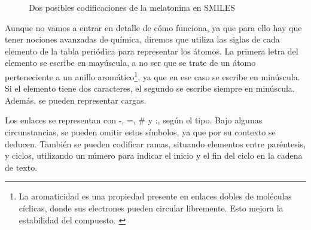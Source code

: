 \begin{figure}[H]
\centering
    \caption{Dos posibles codificaciones de la melatonina en SMILES \cite{smiles_wikipedia}} \label{fig:figura2}
\end{figure}

Aunque no vamos a entrar en detalle de cómo funciona, ya que para ello hay que tener nociones avanzadas de química, diremos que utiliza las siglas de cada elemento de la tabla periódica para representar los átomos. La primera letra del elemento se escribe en mayúscula, a no ser que se trate de un átomo perteneciente a un anillo aromático\footnote{La aromaticidad es una propiedad presente en enlaces dobles de moléculas cíclicas, donde sus electrones pueden circular libremente. Esto mejora la estabilidad del compuesto. \cite{aromaticidad, aromaticidad_wikipedia}}, ya que en ese caso se escribe en minúscula. Si el elemento tiene dos caracteres, el segundo se escribe siempre en minúscula. Además, se pueden representar cargas.

Los enlaces se representan con -, =, \# y :, según el tipo. Bajo algunas circunstancias, se pueden omitir estos símbolos, ya que por su contexto se deducen. También se pueden codificar ramas, situando elementos entre paréntesis, y ciclos, utilizando un número para indicar el inicio y el fin del ciclo en la cadena de texto. \cite{weininger1988smiles}

